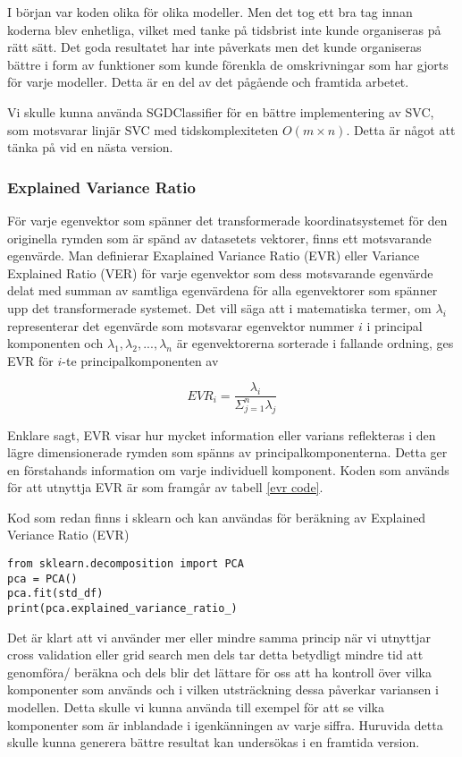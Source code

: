 \documentclass[12pt,a4paper]{article}
\begin{document}
I början var koden olika för olika modeller. Men det tog ett bra tag innan koderna blev enhetliga, vilket med tanke på tidsbrist inte kunde organiseras på rätt sätt. Det goda resultatet har inte påverkats men det kunde organiseras bättre i form av funktioner som kunde förenkla de omskrivningar som har gjorts för varje modeller. Detta är en del av det pågående och framtida arbetet.

Vi skulle kunna använda SGDClassifier för en bättre implementering av SVC, som motsvarar linjär SVC med tidskomplexiteten $O(m \times n)$. Detta är något att tänka på vid en nästa version.

\subsubsection{Explained Variance Ratio}

För varje egenvektor som spänner det transformerade koordinatsystemet för den originella rymden som är spänd av datasetets vektorer, finns ett motsvarande egenvärde. Man definierar Exaplained Variance Ratio (EVR) \citep{Izenman,Kuhn,open} eller Variance Explained Ratio (VER) \citep{Raschka} för varje egenvektor som dess motsvarande egenvärde delat med summan av samtliga egenvärdena för alla egenvektorer som spänner upp det transformerade systemet. Det vill säga att i matematiska termer, om $\lambda_i$ representerar det egenvärde som motsvarar egenvektor nummer $i$ i principal komponenten och $\lambda_1, \lambda_2, ..., \lambda_n$ är  egenvektorerna sorterade i fallande ordning, ges EVR för $i$-te principalkomponenten av

\[ EVR_i = \frac{\lambda_i}{\Sigma_{j=1}^{n}\lambda_j}\]

Enklare sagt, EVR visar hur mycket information eller varians reflekteras i den lägre dimensionerade rymden som spänns av principalkomponenterna. Detta ger en förstahands information om varje individuell komponent. Koden som används för att utnyttja EVR är som framgår av tabell \ref{evr code}.

\begin{table}[t]
	\footnotesize
	\caption{\footnotesize{Kod som redan finns i sklearn och kan användas för beräkning av Explained Veriance Ratio (EVR)}}\label{evr code}
\begin{verbatim}
from sklearn.decomposition import PCA
pca = PCA()
pca.fit(std_df)
print(pca.explained_variance_ratio_)
\end{verbatim}
\end{table}

Det är klart att vi använder mer eller mindre samma princip när vi utnyttjar cross validation eller grid search men dels tar detta betydligt mindre tid att genomföra/ beräkna och dels blir det lättare för oss att ha kontroll över vilka komponenter som används och i vilken utsträckning dessa påverkar variansen i modellen. Detta skulle vi kunna använda till exempel för att se vilka komponenter som är inblandade i igenkänningen av varje siffra. Huruvida detta skulle kunna generera bättre resultat kan undersökas i en framtida version.



\end{document}
